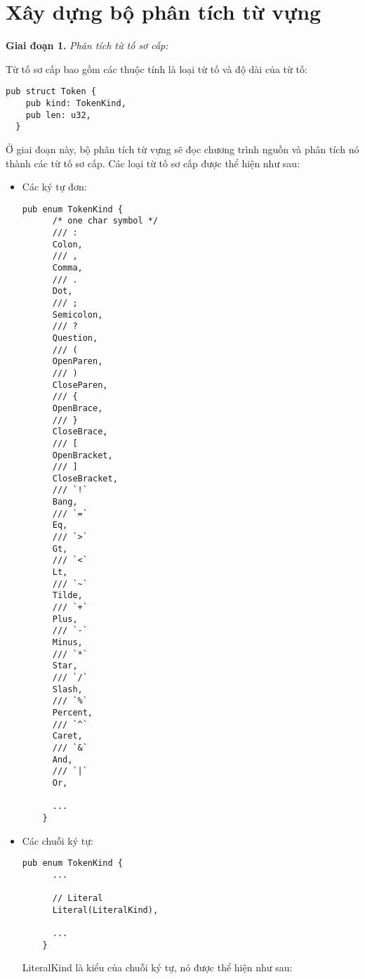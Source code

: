 \section{Xây dựng bộ phân tích từ vựng}
\textbf{Giai đoạn 1.} \textit{Phân tích từ tố sơ cấp:}

Từ tố sơ cấp bao gồm các thuộc tính là loại từ tố và độ dài của từ tố:

\clearpage
\begin{lstlisting}[]
  pub struct Token {
    pub kind: TokenKind,
    pub len: u32,
  }
\end{lstlisting}

Ở giai đoạn này, bộ phân tích từ vựng sẽ đọc chương trình nguồn và phân tích nó thành các từ tố sơ cấp. Các loại từ tố sơ cấp được thể hiện như sau:

\begin{itemize}
  \item Các ký tự đơn: 
  \begin{lstlisting}[]
    pub enum TokenKind {
      /* one char symbol */
      /// :
      Colon,
      /// ,
      Comma,
      /// .
      Dot,
      /// ;
      Semicolon,
      /// ?
      Question,
      /// (
      OpenParen,
      /// )
      CloseParen,
      /// {
      OpenBrace,
      /// }
      CloseBrace,
      /// [
      OpenBracket,
      /// ]
      CloseBracket,
      /// `!`
      Bang,
      /// `=`
      Eq,
      /// `>`
      Gt,
      /// `<`
      Lt,
      /// `~`
      Tilde,
      /// `+`
      Plus,
      /// `-`
      Minus,
      /// `*`
      Star,
      /// `/`
      Slash,
      /// `%`
      Percent,
      /// `^`
      Caret,
      /// `&`
      And,
      /// `|`
      Or,

      ...
    }
  \end{lstlisting}
  \item Các chuỗi ký tự:
  \begin{lstlisting}[]
    pub enum TokenKind {
      ...
  
      // Literal
      Literal(LiteralKind),
  
      ...
    }
  \end{lstlisting}

    LiteralKind là kiểu của chuỗi ký tự, nó được thể hiện như sau:


\end{itemize}
